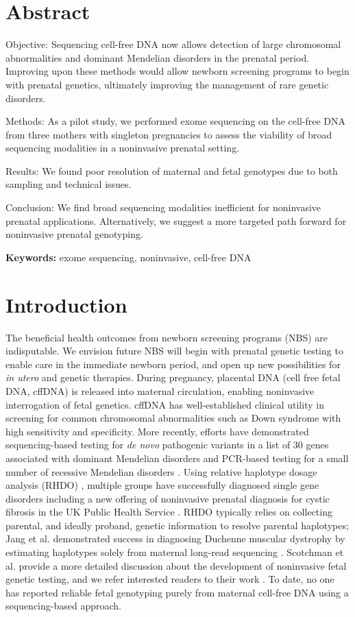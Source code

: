 \documentclass{article}\usepackage[]{graphicx}\usepackage[]{color}
\begin{document}
\section*{Abstract}

Objective: Sequencing cell-free DNA now allows detection of large chromosomal abnormalities and dominant Mendelian disorders in the prenatal period.
Improving upon these methods would allow newborn screening programs to begin with prenatal genetics, ultimately improving the management of rare genetic disorders.

Methods: As a pilot study, we performed exome sequencing on the cell-free DNA from three mothers with singleton pregnancies to assess the viability of broad sequencing modalities in a noninvasive prenatal setting.

Results: We found poor resolution of maternal and fetal genotypes due to both sampling and technical issues.

Conclusion: We find broad sequencing modalities inefficient for noninvasive prenatal applications.
Alternatively, we suggest a more targeted path forward for noninvasive prenatal genotyping.

\textbf{Keywords:} exome sequencing, noninvasive, cell-free DNA

\section{Introduction}

The beneficial health outcomes from newborn screening programs (NBS) are indisputable.
We envision future NBS will begin with prenatal genetic testing to enable care in the immediate newborn period, and open up new possibilities for \textit{in utero} and genetic therapies.
During pregnancy, placental DNA (cell free fetal DNA, cffDNA) is released into maternal circulation, enabling noninvasive interrogation of fetal genetics.
cffDNA has well-established clinical utility in screening for common chromosomal abnormalities such as Down syndrome with high sensitivity and specificity\cite{mackie:2017aa}.
More recently, efforts have demonstrated sequencing-based testing for \textit{de novo} pathogenic variants in a list of 30 genes associated with dominant Mendelian disorders \cite{zhang:2019aa} and PCR-based testing for a small number of recessive Mendelian disorders \cite{tsao:2019ab}.
Using relative haplotype dosage analysis (RHDO) \cite{lo:2010aa}, multiple groups have successfully diagnosed single gene disorders \cite{hui:2017aa,vermeulen:2017aa,jang:2018aa} including a new offering of noninvasive prenatal diagnosis for cystic fibrosis in the UK Public Health Service \cite{chandler:2020aa}.
RHDO typically relies on collecting parental, and ideally proband, genetic information to resolve parental haplotypes; Jang et al. demonstrated success in diagnosing Duchenne muscular dystrophy by estimating haplotypes solely from maternal long-read sequencing \cite{jang:2018aa}.
Scotchman et al. provide a more detailed discussion about the development of noninvasive fetal genetic testing, and we refer interested readers to their work \cite{scotchman:2020aa}.
To date, no one has reported reliable fetal genotyping purely from maternal cell-free DNA using a sequencing-based approach.
\end{document}
